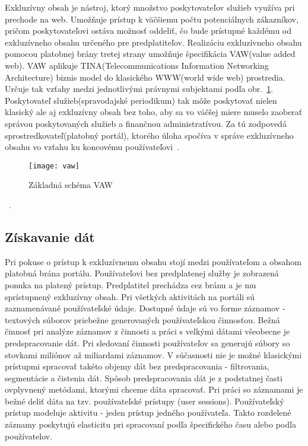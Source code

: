 Exkluzívny obsah je nástroj, ktorý množstvo poskytovateľov služieb využíva pri prechode na web. Umožňuje prístup k väčšiemu počtu potenciálnych zákazníkov, pričom poskytovateľovi ostáva možnosť oddeliť, čo bude prístupné každému od exkluzívneho obsahu určeného pre predplatiteľov. \newline
Realizáciu exkluzívneho obsahu pomocou platobnej brány tretej strany umožňuje špecifikácia VAW(value added web). VAW aplikuje TINA(Telecommunications Information Networking Architecture) biznis model do klasického WWW(world wide web) prostredia.  Určuje tak vzťahy medzi jednotlivými právnymi subjektami podľa obr.~\ref{fig:vaw}. Poskytovateľ služieb(spravodajské periodikum) tak môže poskytovať nielen klasický ale aj exkluzívny obsah bez toho, aby sa vo väčšej miere muselo zaoberať správou poskytovaných služieb a finančnou administratívou. Za tú zodpovedá sprostredkovateľ(platobný portál), ktorého úloha spočíva v správe exkluzívneho obsahu vo vzťahu ku koncovému používateľovi~\cite{van1999value}.

\begin{figure}[H]
\begin{center}\texttt{[image: vaw]}\end{center}
\caption[vaw]{Základná schéma VAW}\label{fig:vaw}
\end{figure}
~\cite{van1999value}.

\subsection{Získavanie dát}
\label{analyza_ziskavanie_dat}

Pri pokuse o prístup k exkluzívnemu obsahu stojí medzi používateľom a obsahom platobná brána portálu. Používateľovi bez predplatenej služby je zobrazená ponuka na platený prístup. Predplatitel prechádza cez bránu a je mu sprístupnený exkluzívny obsah. Pri všetkých aktivitách na portáli sú zaznamenávané používateľské údaje. Dostupné údaje sú vo forme záznamov - textových súborov priebežne generovaných používateľskou činnosťou. 
Bežná činnosť pri analýze záznamov z činnosti a práci s velkými dátami všeobecne je predspracovanie dát. Pri sledovaní činnosti používateľov sa generujú súbory so stovkami miliónov až miliardami záznamov. V súčasnosti nie je možné klasickými prístupmi spracovať takéto objemy dát bez predspracovania - filtrovania, segmentácie a čistenia dát. Spôsob predspracovania dát je z podstatnej časti ovplyvnený metódami, ktorými chceme dáta spracovať. Pri práci so záznamami je bežné deliť dáta na tzv. používateľské prístupy (user sessions). Používateľský prístup modeluje aktivitu - jeden prístup jedného používateľa. Takto rozdelené záznamy poskytujú elasticitu pri spracovaní podľa špecifického času alebo podľa používatelov.

